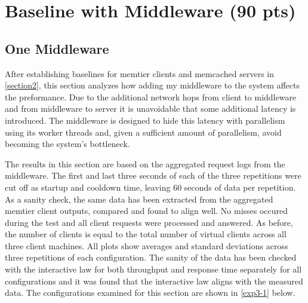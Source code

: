 \documentclass[11pt,a4paper]{article}
\begin{document}

\section{Baseline with Middleware (90 pts)}

\subsection{One Middleware}
After establishing baselines for memtier clients and memcached servers in \autoref{section2}, this section analyzes how adding my middleware to the system affects the preformance. Due to the additional network hops from client to middleware and from middleware to server it is unavoidable that some additional latency is introduced. The middleware is designed to hide this latency with parallelism using its worker threads and, given a sufficient amount of parallelism, avoid becoming the system's bottleneck.

The results in this section are based on the aggregated request logs from the middleware. The first and last three seconds of each of the three repetitions were cut off as startup and cooldown time, leaving 60 seconds of data per repetition. As a sanity check, the same data has been extracted from the aggregated memtier client outputs, compared and found to align well. No misses occured during the test and all client requests were processed and answered. As before, the number of clients is equal to the total number of virtual clients across all three client machines. All plots show averages and standard deviations across three repetitions of each configuration. The sanity of the data has been checked with the interactive law for both throughput and response time separately for all configurations and it was found that the interactive law aligns with the measured data. The configurations examined for this section are shown in \autoref{exp3-1} below.
\end{document}

